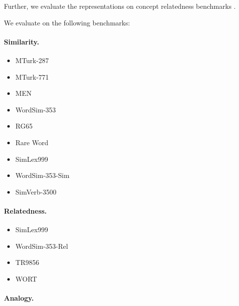\documentclass{article}
\begin{document}
    Further, we evaluate the representations on concept relatedness benchmarks
\cite{levy2015tr9856,eindor2018semantic}.
    
    We evaluate on the following benchmarks:
    
    \paragraph{Similarity.}
    
    \begin{itemize}
        \item MTurk-287~\cite{radinsky2011word}
        \item MTurk-771~\cite{halawi2012large}
        \item MEN~\cite{bruni2012distributional}
        \item WordSim-353~\cite{finkelstein2001placing}
        \item RG65~\cite{rubenstein1965contextual}
        \item Rare Word~\cite{luong2013better}
        \item SimLex999~\cite{hill2015simlex}
        \item WordSim-353-Sim~\cite{agirre2009study}
        \item SimVerb-3500~\cite{Gerz2016emnlp}
    \end{itemize}
    
    \paragraph{Relatedness.}
    
    \begin{itemize}
        \item SimLex999~\cite{hill2015simlex}
        \item WordSim-353-Rel~\cite{agirre2009study}
        \item TR9856~\cite{levy2015tr9856}
        \item WORT~\cite{eindor2018semantic}
    \end{itemize}
    
    \paragraph{Analogy.}
    
\end{document}
